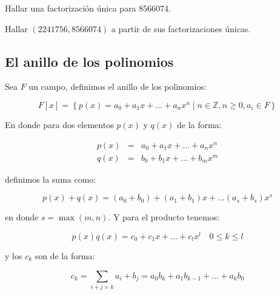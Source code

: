         \begin{ejemplo}
            Hallar una factorización única para $8566074$.
        \end{ejemplo}

        \begin{ejemplo}
            Hallar $(2241756, 8566074)$ a partir de sus factorizaciones únicas.
        \end{ejemplo}

    \subsection{El anillo de los polinomios}

        \begin{definicion}
            Sea $F$ un campo, definimos el anillo de los polinomios:

            \begin{equation}
                F[x] = \left\{ p(x) = a_0 + a_1 x + \dots + a_n x^n \mid n \in \mathbb{Z}, n \geq 0, a_i \in F \right\}
            \end{equation}

            En donde para dos elementos $p(x)$ y $q(x)$ de la forma:

            \begin{eqnarray*}
                p(x) & = & a_0 + a_1 x + \dots + a_n x^n \\
                q(x) & = & b_0 + b_1 x + \dots + b_m x^m 
            \end{eqnarray*}

            definimos la suma como:

            \begin{equation}
                p(x) + q(x) = (a_0 + b_0) + (a_1 + b_1) x + \dots (a_s + b_s) x^s
            \end{equation}

            en donde $s = \max{(m, n)}$. Y para el producto tenemos:

            \begin{equation}
                p(x)q(x) = c_0 + c_1 x + \dots + c_l x^l \quad 0 \leq k \leq l
            \end{equation}

            y los $c_k$ son de la forma:

            \begin{equation}
                c_k = \sum_{i+j = k} a_i + b_j = a_0 b_k + a_1 b_{k-1} + \dots + a_k b_0
            \end{equation}
        \end{definicion}

